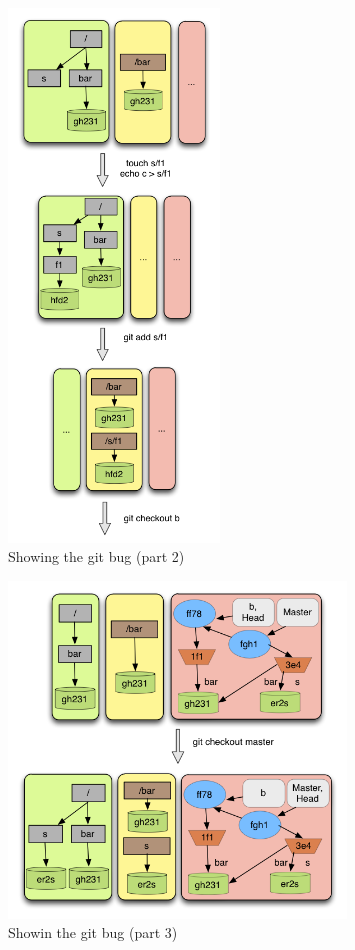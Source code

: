 \begin{figure}[tp]
   \centering
   \includegraphics[width=0.5\textwidth]{images/gitbug2.png}
   \caption{Showing the git bug (part 2)}\label{fig:gitbug2}
\end{figure}
\begin{figure}[tp]
   \centering
   \includegraphics[width=0.8\textwidth]{images/gitbug3.png}
   \caption{Showin the git bug (part 3)}\label{fig:gitbug3}
\end{figure}


